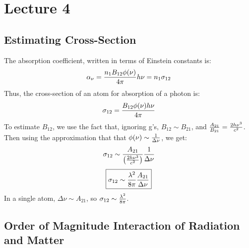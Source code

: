 \documentclass[11pt]{article}
\def\inv#1{{1 \over #1}}
\def\sigot{\sigma_{12}}
\def\ato{{A_{21}}}
\def\bto{{B_{21}}}
\def\bot{{B_{12}}}
\begin{document}
\section*{ Lecture 4 }

\subsection*{ Estimating Cross-Section}

The absorption coefficient, written in terms of Einstein constants is:
$$\alpha_\nu={n_1\bot\phi(\nu)\over4\pi}h\nu=n_1\sigot$$
Thus, the cross-section of an atom for absorption of a photon is:
$$\sigot={\bot\phi(\nu)h\nu\over4\pi}$$
To estimate $\bot$, we use the fact that, ignoring g's, $\bot\sim\bto$,
and ${\ato\over\bto}={2h\nu^3\over c^2}$.  Then using the approximation that
that $\phi(\nu)\sim\inv{\Delta\nu}$, we get:
$$\sigot\sim{\ato\over\left({2h\nu^3\over c^2}\right)}
\inv{\Delta\nu}$$
$$\boxed{\sigot\sim{\lambda^2\over8\pi}{\ato\over\Delta\nu}}$$
In a single atom, $\Delta\nu\sim\ato$, so $\sigot\sim{\lambda^2\over8\pi}$.

\subsection*{ Order of Magnitude Interaction of Radiation and Matter}
\end{document}
